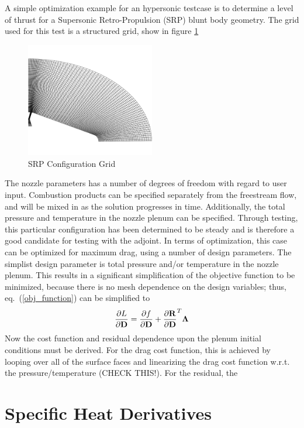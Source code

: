 \documentclass{article}   	%
\begin{document}
A simple optimization example for an hypersonic testcase is to determine a level
of thrust for a Supersonic Retro-Propulsion (SRP) blunt body geometry.  The grid
used for this test is a structured grid, show in figure \ref{fig:srp_grid}
\begin{figure}[h]
  \centering
  \includegraphics[width=0.5\textwidth]{srp_grid}
  \caption{SRP Configuration Grid}
  \label{fig:srp_grid}
\end{figure}
The nozzle parameters has a number of degrees of freedom with regard to user
input.  Combustion products can be specified separately from the freestream
flow, and will be mixed in as the solution progresses in time. Additionally, the
total pressure and temperature in the nozzle plenum can be specified.  Through
testing, this particular configuration has been determined to be steady and is
therefore a good candidate for testing with the adjoint.  In terms of
optimization, this case can be optimized for maximum drag, using a number of
design parameters.  The simplist design parameter is total pressure and/or
temperature in the nozzle plenum.  This results in a significant simplification
of the objective function to be minimized, because there is no mesh dependence
on the design variables; thus, eq.~(\ref{obj_function}) can be simplified to
\begin{equation}
  \frac{\partial L}{\partial {\mathbf D}}=
  \frac{\partial f}{\partial {\mathbf D}}
  +\frac{\partial {\mathbf R}}{\partial {\mathbf D}}^T\mathbf{\Lambda}
  \label{simp_obj_func}
\end{equation}
Now the cost function and residual dependence upon the plenum initial conditions
must be derived.  For the drag cost function, this is achieved by looping over
all of the surface faces and linearizing the drag cost function w.r.t. the
pressure/temperature (CHECK THIS!).  For the residual, the 

\section{Specific Heat Derivatives}
\end{document}
